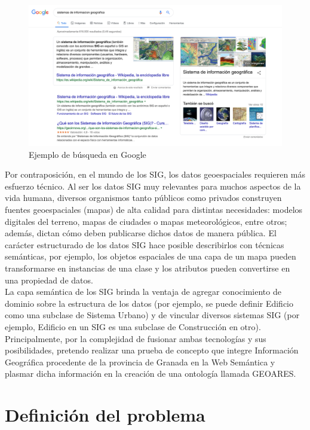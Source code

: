 \begin{figure}[H]
	\centering
	\includegraphics[width=1.07\linewidth]{imagenes/capitulo1/ejemplo-sig1}
	\caption{Ejemplo de búsqueda en Google}
	\label{fig:ejemplo-sig}
\end{figure}

Por contraposición, en el mundo de los SIG, los datos geoespaciales requieren más esfuerzo técnico. Al ser los datos SIG muy relevantes para muchos aspectos de la vida humana, diversos organismos tanto públicos como privados construyen fuentes geoespaciales (mapas) de alta calidad para distintas necesidades: modelos digitales del terreno, mapas de ciudades o mapas meteorológicos, entre otros; además, dictan cómo deben publicarse dichos datos de manera pública. El carácter estructurado de los datos SIG hace posible describirlos con técnicas semánticas, por ejemplo, los objetos espaciales de una capa de un mapa pueden transformarse en instancias de una clase y los atributos pueden convertirse en una propiedad de datos.\\

La capa semántica de los SIG brinda la ventaja de agregar conocimiento de dominio sobre la estructura de los datos (por ejemplo, se puede definir Edificio como una subclase de Sistema Urbano) y de vincular diversos sistemas SIG (por ejemplo, Edificio en un SIG es una subclase de Construcción en otro). Principalmente, por la complejidad de fusionar ambas tecnologías y sus posibilidades, pretendo realizar una prueba de concepto que integre Información Geográfica procedente de la provincia de Granada en la Web Semántica y plasmar dicha información en la creación de una ontología llamada GEOARES.


\section{Definición del problema}


